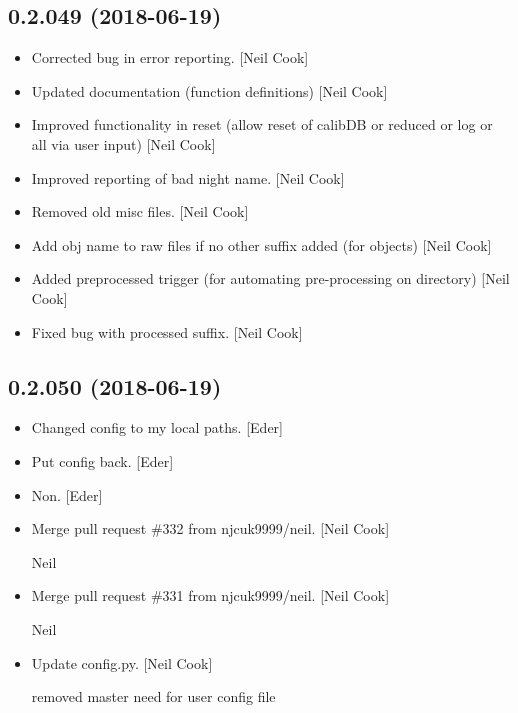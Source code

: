 \documentclass[a4paper,10pt,english]{report}
\begin{document}
\subsection{0.2.049 (2018-06-19)}
\label{\detokenize{misc/changelog:id416}}\begin{itemize}
\item {} 
Corrected bug in  error reporting. {[}Neil Cook{]}

\item {} 
Updated documentation (function definitions) {[}Neil Cook{]}

\item {} 
Improved functionality in reset (allow reset of calibDB or reduced or
log or all via user input) {[}Neil Cook{]}

\item {} 
Improved reporting of bad night name. {[}Neil Cook{]}

\item {} 
Removed old misc files. {[}Neil Cook{]}

\item {} 
Add obj name to raw files if no other suffix added (for objects) {[}Neil
Cook{]}

\item {} 
Added preprocessed trigger (for automating pre-processing on
 directory) {[}Neil Cook{]}

\item {} 
Fixed bug with processed suffix. {[}Neil Cook{]}

\end{itemize}


\subsection{0.2.050 (2018-06-19)}
\label{\detokenize{misc/changelog:id417}}\begin{itemize}
\item {} 
Changed config to my local paths. {[}Eder{]}

\item {} 
Put config back. {[}Eder{]}

\item {} 
Non. {[}Eder{]}

\item {} 
Merge pull request \#332 from njcuk9999/neil. {[}Neil Cook{]}

Neil

\item {} 
Merge pull request \#331 from njcuk9999/neil. {[}Neil Cook{]}

Neil

\item {} 
Update config.py. {[}Neil Cook{]}

removed master need for user config file

\end{itemize}
\end{document}

